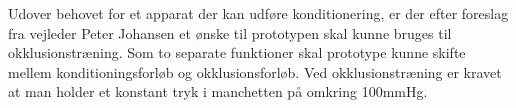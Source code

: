 Udover behovet for et apparat der kan udføre konditionering, er der efter foreslag fra vejleder Peter Johansen et ønske til prototypen skal kunne bruges til okklusionstræning. Som to separate funktioner skal prototype kunne skifte mellem konditioningsforløb og okklusionsforløb. Ved okklusionstræning er kravet at man holder et konstant tryk i manchetten på omkring 100mmHg. 


